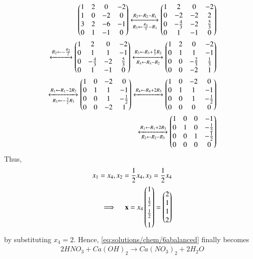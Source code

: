 \begin{align}
    \begin{pmatrix}1 & 2 & 0 & -2\\
           1 & 0 & -2 & 0\\
           3 & 2 & -6 & -1\\
           0 & 1 & -1 & 0\end{pmatrix}
    \xleftrightarrow[R_{3}\leftarrow \frac{R_3}{3}-R_{1}]{R_{2}\leftarrow R_2- R_1}
    \begin{pmatrix}1 & 2 & 0 & -2\\
           0 & -2 & -2 & 2\\
           0 & -\frac{4}{3} & -2 & \frac{5}{3}\\
           0 & 1 & -1 & 0\end{pmatrix}\\
    \xleftrightarrow{R_2 \leftarrow -\frac{R_2}{2}}
    \begin{pmatrix}1 & 2 & 0 & -2\\
          0 & 1 & 1 & -1\\
          0 & -\frac{4}{3} & -2 & \frac{5}{3}\\
          0 & 1 & -1 & 0\end{pmatrix}
    \xleftrightarrow[R_4 \leftarrow R_4- R_2]{R_3 \leftarrow R_3 + \frac{4}{3}R_2}
    \begin{pmatrix}1 & 2 & 0 & -2\\
           0 & 1 & 1 & -1\\
           0 & 0 & -\frac{2}{3} & \frac{1}{3}\\
           0 & 0 & -2 & 1\end{pmatrix}\\
    \xleftrightarrow[R_3 \leftarrow -\frac{3}{2}R_3]{R_1 \leftarrow R_1- 2R_2}
    \begin{pmatrix}1 & 0 & -2 & 0\\
           0 & 1 & 1 & -1\\
           0 & 0 & 1 & -\frac{1}{2}\\
           0 & 0 & -2 & 1\end{pmatrix}
    \xleftrightarrow{R_4\leftarrow R_4 + 2R_3}
    \begin{pmatrix}1 & 0 & -2 & 0\\
           0 & 1 & 1 & -1\\
           0 & 0 & 1 & -\frac{1}{2}\\
           0 & 0 & 0 & 0\end{pmatrix}\\
    \xleftrightarrow[R_2\leftarrow R_2-R_3]{R_1\leftarrow R_1 + 2R_3}
    \begin{pmatrix}1 & 0 & 0 & -1\\
           0 & 1 & 0 & -\frac{1}{2}\\
           0 & 0 & 1 & -\frac{1}{2}\\
           0 & 0 & 0 & 0\end{pmatrix}
\end{align}
Thus,
\begin{align}
    x_1=x_4, x_2= \frac{1}{2}x_4, x_3=\frac{1}{2}x_4\\
    \implies \quad\mathbf{x}= x_4\begin{pmatrix}1\\[1ex] \frac{1}{2}\\[1ex] \frac{1}{2}\\[1ex]1\end{pmatrix} =\begin{pmatrix}2\\1\\1\\2\end{pmatrix} 
\end{align} 
by substituting $x_4= 2$.
Hence, \eqref{eq:solutions/chem/6abalanced} finally becomes
\begin{align}
    2HNO_{3}+ Ca(OH)_{2}\to Ca(NO_{3})_{2}+ 2H_{2}O
\end{align}
